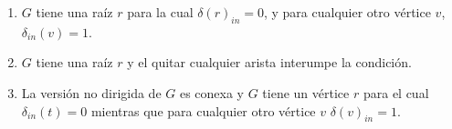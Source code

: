 \documentclass[12pt,a4paper]{report}
\begin{document}
\begin{enumerate}
{\begin{enumerate} [label = \alph*)]
			\item{
				$G$ tiene una raíz $r$ para la cual $\delta(r)_{in} = 0$, y para cualquier
				otro vértice $v$, $\delta_{in}(v) = 1$.\\
			}

			\item{
				$G$ tiene una raíz $r$ y el quitar cualquier arista interumpe la
				condición.
			}
			\item{
				La versión no dirigida de $G$ es conexa y $G$ tiene un vértice $r$ para
				el cual $\delta_{in}(t) = 0$ mientras que para cualquier otro vértice
				$v$ $\delta(v)_{in} = 1$.
			}
		\end{enumerate}
	}

\end{enumerate}
\end{document}
